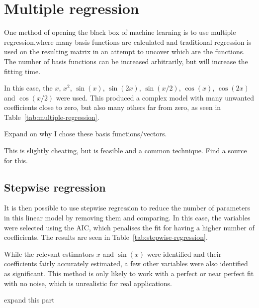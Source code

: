 \section{Multiple regression}

One method of opening the black box of machine learning is to use multiple regression,where many basis functions are calculated and traditional regression is used on the resulting matrix in an attempt to uncover which are the  functions.
The number of basis functions can be increased arbitrarily, but will increase the fitting time. 

In this case, the  \(x\), \(x^2\), \(\sin(x)\), \(\sin(2x)\), \(\sin(x/2)\), \(\cos(x)\), \(\cos(2x)\) and \(\cos(x/2)\) were used.
This produced a complex model with many unwanted coefficients close to zero, but also many others far from zero, as seen in Table~\ref{tab:multiple-regression}.

\begin{todo}
	Expand on why I chose these basis functions/vectors.
\end{todo}


\begin{todo}
	This is slightly cheating, but is feasible and a common technique. Find a source for this.
\end{todo}

\subsection{Stepwise regression}

It is then possible to use stepwise regression to reduce the number of parameters in this linear model by removing them and comparing.
In this case, the variables were selected using the \ac{AIC}, which penalises the fit for having a higher number of coefficients.
The results are seen in Table~\ref{tab:stepwise-regression}.


While the relevant estimators \(x\) and \(\sin(x)\) were identified and their coefficients fairly accurately estimated, a few other variables were also identified as significant.
This method is only likely to work with a perfect or near perfect fit with no noise, which is unrealistic for real applications.

\begin{todo}
	expand this part
\end{todo}


